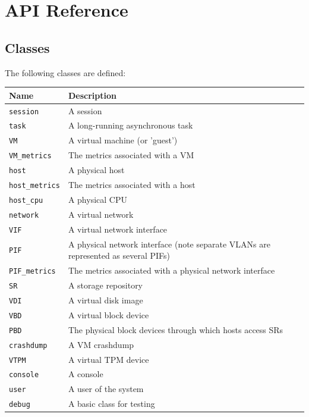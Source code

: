 %
%
%
%

\chapter{API Reference}
\label{api-reference}


\section{Classes}
The following classes are defined:

\begin{center}\begin{tabular}{|lp{10cm}|}
\hline
Name & Description \\
\hline
{\tt session} & A session \\
{\tt task} & A long-running asynchronous task \\
{\tt VM} & A virtual machine (or 'guest') \\
{\tt VM\_metrics} & The metrics associated with a VM \\
{\tt host} & A physical host \\
{\tt host\_metrics} & The metrics associated with a host \\
{\tt host\_cpu} & A physical CPU \\
{\tt network} & A virtual network \\
{\tt VIF} & A virtual network interface \\
{\tt PIF} & A physical network interface (note separate VLANs are represented as several PIFs) \\
{\tt PIF\_metrics} & The metrics associated with a physical network interface \\
{\tt SR} & A storage repository \\
{\tt VDI} & A virtual disk image \\
{\tt VBD} & A virtual block device \\
{\tt PBD} & The physical block devices through which hosts access SRs \\
{\tt crashdump} & A VM crashdump \\
{\tt VTPM} & A virtual TPM device \\
{\tt console} & A console \\
{\tt user} & A user of the system \\
{\tt debug} & A basic class for testing \\
\hline
\end{tabular}\end{center}
